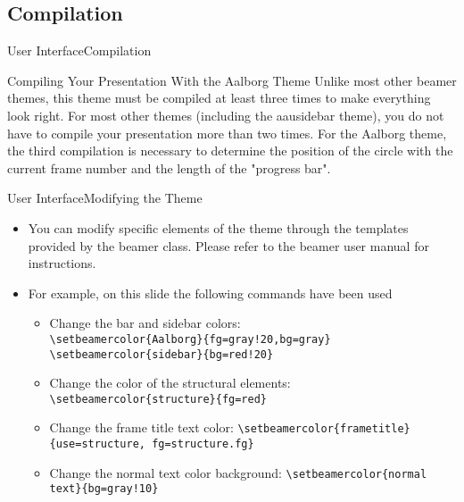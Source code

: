 \documentclass[10pt]{beamer}
\begin{document}
\subsection{Compilation}
\begin{frame}{User Interface}{Compilation}

\begin{block}{Compiling Your Presentation With the Aalborg Theme}
  Unlike most other beamer themes, this theme must be compiled at least \alert{three} times to make everything look right. For most other themes (including the aausidebar theme), you do not have to compile your presentation more than two times. For the Aalborg theme, the third compilation is necessary to determine the position of the circle with the current frame number and the length of the "progress bar".
\end{block}
\end{frame}


{
\begin{frame}{User Interface}{Modifying the Theme}
  \begin{itemize}
    \item<1-> You can modify specific elements of the theme through the templates provided by the beamer class. Please refer to the beamer user manual for instructions.
    \item<2-> For example, on this slide the following commands have been used
      \begin{itemize}
        \item Change the bar and sidebar colors:\\
        {\tt \textbackslash setbeamercolor\{Aalborg\}\{fg=gray!20,bg=gray\}}
        {\tt \textbackslash setbeamercolor\{sidebar\}\{bg=red!20\}}
        \item Change the color of the structural elements:\\
        {\tt \textbackslash setbeamercolor\{structure\}\{fg=red\}}\\
        \item Change the frame title text color:
        {\tt \textbackslash setbeamercolor\{frametitle\}\{use=structure, fg=structure.fg\}}
        \item Change the normal text color background:
        {\tt \textbackslash setbeamercolor\{normal text\}\{bg=gray!10\}}
      \end{itemize}
  \end{itemize}
\end{frame}}
\end{document}
